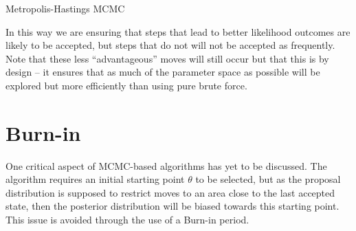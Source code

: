     \begin{algorithm}[H]

        \BlankLine

        \DontPrintSemicolon


        \BlankLine


        \BlankLine


        \BlankLine

        \caption{Metropolis-Hastings MCMC}\label{mhmcmc}

    \end{algorithm}
    

    In this way we are ensuring that steps that lead to better likelihood outcomes are likely to be accepted, but steps that do not will not be accepted as frequently. Note that these less ``advantageous'' moves will still occur but that this is by design -- it ensures that as much of the parameter space as possible will be explored but more efficiently than using pure brute force.


\section{Burn-in}

    One critical aspect of MCMC-based algorithms has yet to be discussed. The algorithm requires an initial starting point $\theta$ to be selected, but as the proposal distribution is supposed to restrict moves to an area close to the last accepted state, then the posterior distribution will be biased towards this starting point. This issue is avoided through the use of a Burn-in period.

